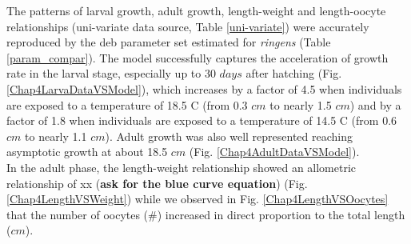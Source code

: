 The patterns of larval growth, adult growth, length-weight and length-oocyte relationships (uni-variate data source, Table \ref{uni-variate}) were accurately reproduced by the \acrshort{deb} parameter set estimated for \textit{\gls{ringens}} (Table \ref{param_compar}). The model successfully captures the acceleration of growth rate in the larval stage, especially up to 30 $days$ after hatching (Fig. \ref{Chap4LarvaDataVSModel}), which increases by a factor of 4.5 when individuals are exposed to a temperature of 18.5 \textdegree C (from 0.3 $cm$ to nearly 1.5 $cm$) and by a factor of 1.8 when individuals are exposed to a temperature of 14.5 \textdegree C (from 0.6 $cm$ to nearly 1.1 $cm$). Adult growth was also well represented reaching asymptotic growth at about 18.5 $cm$ (Fig. \ref{Chap4AdultDataVSModel}).\\

In the adult phase, the length-weight relationship showed an allometric relationship of xx (\textbf{ask for the blue curve equation}) (Fig. \ref{Chap4LengthVSWeight}) while we observed in Fig. \ref{Chap4LengthVSOocytes} that the number of oocytes ($\#$) increased in direct proportion to the total length ($cm$).\\

